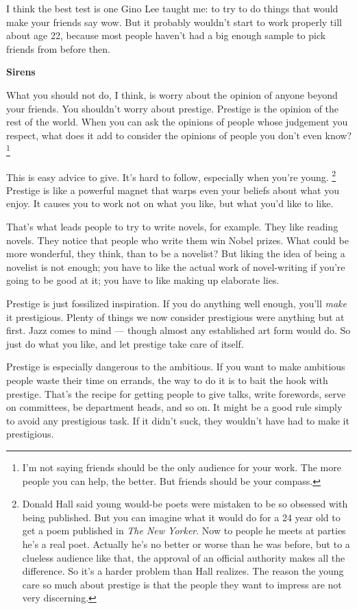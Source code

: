 I think the best test is one Gino Lee taught me: to try to do things
that would make your friends say wow. But it probably wouldn't start to
work properly till about age 22, because most people haven't had a big
enough sample to pick friends from before then.

\textbf{Sirens}

What you should not do, I think, is worry about the opinion of anyone
beyond your friends. You shouldn't worry about prestige. Prestige is the
opinion of the rest of the world. When you can ask the opinions of
people whose judgement you respect, what does it add to consider the
opinions of people you don't even know? \footnote{I'm not saying friends should be the only audience for your
work. The more people you can help, the better. But friends should be
your compass.}

This is easy advice to give. It's hard to follow, especially when you're
young. \footnote{Donald Hall said young would-be poets were mistaken to be so
obsessed with being published. But you can imagine what it would do for
a 24 year old to get a poem published in \emph{The New Yorker}. Now to
people he meets at parties he's a real poet. Actually he's no better or
worse than he was before, but to a clueless audience like that, the
approval of an official authority makes all the difference. So it's a
harder problem than Hall realizes. The reason the young care so much
about prestige is that the people they want to impress are not very
discerning.} Prestige is like a powerful magnet that
warps even your beliefs about what you enjoy. It causes you to work not
on what you like, but what you'd like to like.

That's what leads people to try to write novels, for example. They like
reading novels. They notice that people who write them win Nobel prizes.
What could be more wonderful, they think, than to be a novelist? But
liking the idea of being a novelist is not enough; you have to like the
actual work of novel-writing if you're going to be good at it; you have
to like making up elaborate lies.

Prestige is just fossilized inspiration. If you do anything well enough,
you'll \emph{make} it prestigious. Plenty of things we now consider
prestigious were anything but at first. Jazz comes to mind --- though
almost any established art form would do. So just do what you like, and
let prestige take care of itself.

Prestige is especially dangerous to the ambitious. If you want to make
ambitious people waste their time on errands, the way to do it is to
bait the hook with prestige. That's the recipe for getting people to
give talks, write forewords, serve on committees, be department heads,
and so on. It might be a good rule simply to avoid any prestigious task.
If it didn't suck, they wouldn't have had to make it prestigious.

